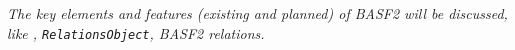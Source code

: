 
{\it The key elements and features (existing and planned) of BASF2 will be discussed, like \dStore, {\tt RelationsObject}, BASF2 relations.}